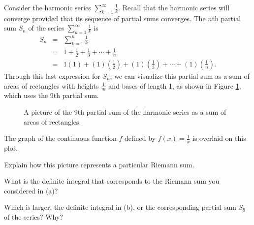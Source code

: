 \begin{activity} \label{8.3.Act4} Consider the harmonic series $ \sum_{k=1}^{\infty} \frac{1}{k}$. Recall that the harmonic series will converge provided that its sequence of partial sums converges. The $n$th partial sum $S_n$ of the series $ \sum_{k=1}^{\infty} \frac{1}{k}$ is
 \begin{eqnarray*}
 S_n & = & \sum_{k=1}^{n} \frac{1}{k} \\
 	& = & 1 + \frac{1}{2} + \frac{1}{3} + \cdots + \frac{1}{n} \\
 	& = & 1(1) + (1)\left(\frac{1}{2}\right) + (1)\left(\frac{1}{3}\right) + \cdots + (1)\left(\frac{1}{n}\right).
\end{eqnarray*}
Through this last expression for $S_n$, we can visualize this partial sum as a sum of areas of rectangles with heights $\frac{1}{m}$ and bases of length 1, as shown in Figure \ref{F:8.3.4_Integral_Test}, which uses the 9th partial sum.
\begin{figure}[h]
\begin{center}
\caption{A picture of the 9th partial sum of the harmonic series as a sum of areas of rectangles.}
\label{F:8.3.4_Integral_Test}
\end{center}
\end{figure}
The graph of the continuous function $f$ defined by $f(x) = \frac{1}{x}$ is overlaid on this plot. 
\ba
\item Explain how this picture represents a particular Riemann sum.
\item What is the definite integral that corresponds to the Riemann sum you considered in (a)?
\item Which is larger, the definite integral in (b), or the corresponding partial sum $S_9$ of the series? Why?


\end{activity}
